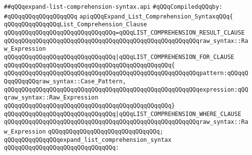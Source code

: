 \label{src/lib/compiler/front/parser/raw-syntax/expand-list-comprehension-syntax.api}
\verb|##qQQqexpand-list-comprehension-syntax.api|\newline
\newline
\verb|#qQQqCompiledqQQqby:|\newline
\verb|#qQQqqQQqqQQqqQQqqQQq|\newline
\newline
\newline
\newline
\verb|apiqQQqExpand_List_Comprehension_SyntaxqQQq{|\newline
\newline
\verb|qQQqqQQqqQQqqQQqList_Comprehension_Clause|\newline
\newline
\verb|qQQqqQQqqQQqqQQqqQQqqQQqqQQqqQQq=qQQqLIST_COMPREHENSION_RESULT_CLAUSE|\newline
\verb|qQQqqQQqqQQqqQQqqQQqqQQqqQQqqQQqqQQqqQQqqQQqqQQqqQQqqQQqraw_syntax::Raw_Expression|\newline
\newline
\verb|qQQqqQQqqQQqqQQqqQQqqQQqqQQqqQQq|\verb#|qQQqLIST_COMPREHENSION_FOR_CLAUSE#\newline
\verb|qQQqqQQqqQQqqQQqqQQqqQQqqQQqqQQqqQQqqQQqqQQqqQQq{|\newline
\verb|qQQqqQQqqQQqqQQqqQQqqQQqqQQqqQQqqQQqqQQqqQQqqQQqqQQqqQQqpattern:qQQqqQQqqQQqqQQqraw_syntax::Case_Pattern,|\newline
\verb|qQQqqQQqqQQqqQQqqQQqqQQqqQQqqQQqqQQqqQQqqQQqqQQqqQQqqQQqexpression:qQQqraw_syntax::Raw_Expression|\newline
\verb|qQQqqQQqqQQqqQQqqQQqqQQqqQQqqQQqqQQqqQQqqQQqqQQq}|\newline
\newline
\verb|qQQqqQQqqQQqqQQqqQQqqQQqqQQqqQQq|\verb#|qQQqLIST_COMPREHENSION_WHERE_CLAUSE#\newline
\verb|qQQqqQQqqQQqqQQqqQQqqQQqqQQqqQQqqQQqqQQqqQQqqQQqqQQqqQQqraw_syntax::Raw_Expression|\newline
\newline
\verb|qQQqqQQqqQQqqQQqqQQqqQQqqQQqqQQq;|\newline
\newline
\newline
\verb|qQQqqQQqqQQqqQQqexpand_list_comprehension_syntax|\newline
\verb|qQQqqQQqqQQqqQQqqQQqqQQqqQQqqQQq:|\newline
